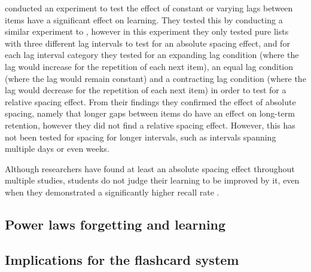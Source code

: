  conducted an experiment to test the effect of constant or varying lags between items have a significant effect on learning. They tested this by conducting a similar experiment to , however in this experiment they only tested pure lists with three different lag intervals to test for an absolute spacing effect, and for each lag interval category they tested for an expanding lag condition (where the lag would increase for the repetition of each next item), an equal lag condition (where the lag would remain constant) and a contracting lag condition (where the lag would decrease for the repetition of each next item) in order to test for a relative spacing effect. From their findings they confirmed the effect of absolute spacing, namely that longer gaps between items do have an effect on long-term retention, however they did not find a relative spacing effect. However, this has not been tested for spacing for longer intervals, such as intervals spanning multiple days or even weeks.

Although researchers have found at least an absolute spacing effect throughout multiple studies, students do not judge their learning to be improved by it, even when they demonstrated a significantly higher recall rate \cite{logan}.

\subsection{Power laws forgetting and learning}

\subsection{Implications for the flashcard system}

